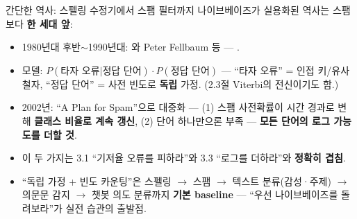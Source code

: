 \documentclass[aspectratio=169,11pt]{beamer}
\begin{document}

\begin{frame}{간단한 역사: 스펠링 수정기에서 스팸 필터까지}
  나이브베이즈가 실용화된 역사는 스팸보다 \textbf{한 세대 앞}:
  \begin{itemize}
    \item 1980년대 후반$\sim$1990년대: 와
      Peter Fellbaum 등 --- .
    \item 모델: $P(\text{타자 오류}|\text{정답 단어})
      \cdot P(\text{정답 단어})$ --- ``타자 오류'' = 인접 키/유사
      철자, ``정답 단어'' = 사전 빈도로 \textbf{독립} 가정.
      (2.3절 Viterbi의 전신이기도 함.)
    \item 2002년:  ``A Plan for Spam''으로 대중화 ---
      (1) 스팸 사전확률이 시간 경과로 변해 \textbf{클래스 비율로
        계속 갱신}, (2) 단어 하나만으론 부족 --- \textbf{모든 단어의
        로그 가능도를 더할 것}.
    \item 이 두 가지는 3.1 ``기저율 오류를 피하라''와 3.3 ``로그를
      더하라''와 \textbf{정확히 겹침}.
    \item ``독립 가정 + 빈도 카운팅''은 스펠링 $\to$ 스팸 $\to$
      텍스트 분류(감성·주제) $\to$ 의문문 감지 $\to$ 챗봇 의도
      분류까지 \textbf{기본 baseline} --- ``우선 나이브베이즈를
      돌려보라''가 실전 습관의 출발점.
  \end{itemize}
\end{frame}
\end{document}

